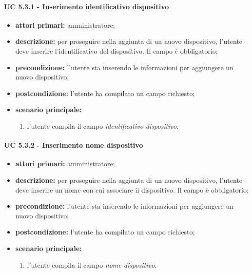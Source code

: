 				\paragraph{UC 5.3.1 - Inserimento identificativo dispositivo}
				\begin{itemize}
					\item \textbf{attori primari:} amministratore;
					\item \textbf{descrizione:} per proseguire nella aggiunta di un nuovo dispositivo, l'utente deve inserire l'identificativo del dispositivo. Il campo è obbligatorio;
					\item \textbf{precondizione:} l'utente sta inserendo le informazioni per aggiungere un nuovo dispositivo;
					\item \textbf{postcondizione:} l'utente ha compilato un campo richiesto;
					\item \textbf{scenario principale:}
					\begin{enumerate}
						\item{l'utente compila il campo \textit{identificativo dispositivo}.}
					\end{enumerate}
				\end{itemize}

				\paragraph{UC 5.3.2 - Inserimento nome dispositivo}
				\begin{itemize}
					\item \textbf{attori primari:} amministratore;
					\item \textbf{descrizione:} per proseguire nella aggiunta di un nuovo dispositivo, l'utente deve inserire un nome con cui associare il dispositivo. Il campo è obbligatorio;
					\item \textbf{precondizione:} l'utente sta inserendo le informazioni per aggiungere un nuovo dispositivo;
					\item \textbf{postcondizione:} l'utente ha compilato un campo richiesto;
					\item \textbf{scenario principale:}
					\begin{enumerate}
						\item{l'utente compila il campo \textit{nome dispositivo}.}
					\end{enumerate}
				\end{itemize}

